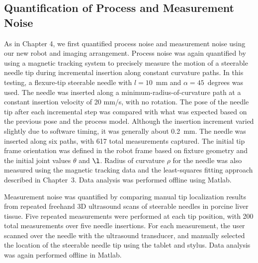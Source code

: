 \subsection{Quantification of Process and Measurement Noise}
As in Chapter 4, we first quantified process noise and measurement noise using our new robot and imaging arrangement. Process noise was again quantified by using a magnetic tracking system to precisely measure the motion of a steerable needle tip during incremental insertion along constant curvature paths. In this testing, a flexure-tip steerable needle with $l = 10$~mm and $\alpha = 45$~degrees was used. The needle was inserted along a minimum-radius-of-curvature path at a constant insertion velocity of 20 mm/s, with no rotation. The pose of the needle tip after each incremental step was compared with what was expected based on the previous pose and the process model. Although the insertion increment varied slightly due to software timing, it was generally about 0.2~mm. The needle was inserted along six paths, with 617 total measurements captured. The initial tip frame orientation was defined in the robot frame based on fixture geometry and the initial joint values $\theta$ and $\l$. Radius of curvature $\rho$ for the needle was also measured using the magnetic tracking data and the least-squares fitting approach described in Chapter~3. Data analysis was performed offline using Matlab. 

Measurement noise was quantified by comparing manual tip localization results from repeated freehand 3D ultrasound scans of steerable needles in porcine liver tissue. Five repeated measurements were performed at each tip position, with 200 total measurements over five needle insertions. For each measurement, the user scanned over the needle with the ultrasound transducer, and manually selected the location of the steerable needle tip using the tablet and stylus. Data analysis was again performed offline in Matlab.

